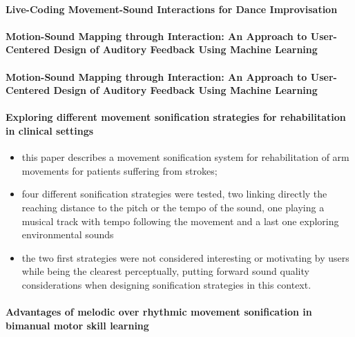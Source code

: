 \documentclass[11pt]{article}
\begin{document}
\paragraph{Live-Coding Movement-Sound Interactions for Dance Improvisation} \citep{francoise_live-coding_2020}

\paragraph{Motion-Sound Mapping through Interaction: An Approach to User-Centered Design of Auditory Feedback Using Machine Learning} \citep{francoise_motion-sound_2018}

\paragraph{Motion-Sound Mapping through Interaction: An Approach to User-Centered Design of Auditory Feedback Using Machine Learning} \citep{francoise_motion-sound_2018}

\paragraph{Exploring different movement sonification strategies for rehabilitation in clinical settings} \citep{bevilacqua_exploring_2018}
\begin{itemize}
    \item this paper describes a movement sonification system for rehabilitation of arm movements for patients suffering from strokes;
    \item four different sonification strategies were tested, two linking directly the reaching distance to the pitch or the tempo of the sound, one playing a musical track with tempo following the movement and a last one exploring environmental sounds
    \item the two first strategies were not considered interesting or motivating by users while being the clearest perceptually, putting forward sound quality considerations when designing sonification strategies in this context.
\end{itemize}

\paragraph{Advantages of melodic over rhythmic movement sonification in bimanual motor skill learning} \citep{dyer_advantages_2017}
\end{document}
